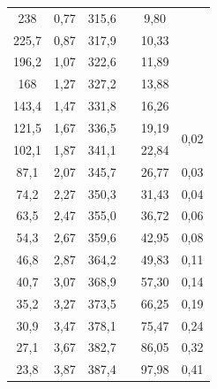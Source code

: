 \documentclass[a4paper,12pt]{report}
\begin{document}
\begin{table}[h!]
\begin{tabular}{|c|c|c|c|c|c|}
238       & 0,77 & 315,6 &                       & 9,80      &                        \\ \cline{1-3} \cline{5-5}
225,7     & 0,87 & 317,9 &                       & 10,33     &                        \\ \cline{1-3} \cline{5-5}
196,2     & 1,07 & 322,6 &                       & 11,89     &                        \\ \cline{1-3} \cline{5-5}
168       & 1,27 & 327,2 &                       & 13,88     &                        \\ \cline{1-3} \cline{5-5}
143,4     & 1,47 & 331,8 &                       & 16,26     &                        \\ \cline{1-3} \cline{5-6} 
121,5     & 1,67 & 336,5 &                       & 19,19     & \multirow{2}{*}{0,02}  \\ \cline{1-3} \cline{5-5}
102,1     & 1,87 & 341,1 &                       & 22,84     &                        \\ \cline{1-3} \cline{5-6} 
87,1      & 2,07 & 345,7 &                       & 26,77     & 0,03                   \\ \cline{1-3} \cline{5-6} 
74,2      & 2,27 & 350,3 &                       & 31,43     & 0,04                   \\ \cline{1-3} \cline{5-6} 
63,5      & 2,47 & 355,0 &                       & 36,72     & 0,06                   \\ \cline{1-3} \cline{5-6} 
54,3      & 2,67 & 359,6 &                       & 42,95     & 0,08                   \\ \cline{1-3} \cline{5-6} 
46,8      & 2,87 & 364,2 &                       & 49,83     & 0,11                   \\ \cline{1-3} \cline{5-6} 
40,7      & 3,07 & 368,9 &                       & 57,30     & 0,14                   \\ \cline{1-3} \cline{5-6} 
35,2      & 3,27 & 373,5 &                       & 66,25     & 0,19                   \\ \cline{1-3} \cline{5-6} 
30,9      & 3,47 & 378,1 &                       & 75,47     & 0,24                   \\ \cline{1-3} \cline{5-6} 
27,1      & 3,67 & 382,7 &                       & 86,05     & 0,32                   \\ \cline{1-3} \cline{5-6} 
23,8      & 3,87 & 387,4 &                       & 97,98     & 0,41                   \\ \cline{1-3} \cline{5-6} 

\end{tabular}
\end{table}
\end{document}
